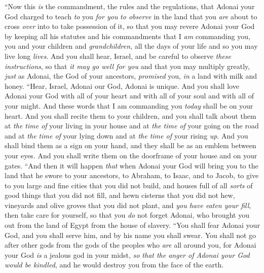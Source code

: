 \begin{biblechapter} %
 “Now this \textit{is} the commandment, the rules and the regulations, that Adonai your God charged to teach \textit{to} you \textit{for you} \textit{to observe} in the land that you \textit{are} about to cross \textit{over} into to take possession of it,
\verse so that you may revere Adonai your God by keeping all his statutes and his commandments that I \textit{am} commanding you, you and your children and \textit{grandchildren}, all the days of your life and so you may live long \textit{lives}.
\verse And you shall hear, Israel, and be careful to observe \textit{these instructions}, so that \textit{it may go well for you} and that you may multiply greatly, \textit{just} as Adonai, the God of your ancestors, \textit{promised} you, \textit{in} a land with milk and honey.
\verse “Hear, Israel, Adonai our God, Adonai is unique.
\verse And you shall love Adonai your God with all of your heart and with all of your soul and with all of your might.
\verse And these words that I am commanding you \textit{today} shall be on your heart.
\verse And you shall recite them to your children, and you shall talk about them at \textit{the time of} your living in your house and at \textit{the time of} your going on the road and at \textit{the time of} your lying down and at \textit{the time of} your rising \textit{up}.
\verse And you shall bind them as a sign on your hand, and they shall be as an emblem between your eyes.
\verse And you shall write them on the doorframe of your house and on your gates.
\verse “And then it will happen \textit{that} when Adonai your God will bring you to the land that he swore to your ancestors, to Abraham, to Isaac, and to Jacob, to give to you large and fine cities that you did not build,
\verse and houses full of all \textit{sorts} of good things that you did not fill, and hewn cisterns that you did not hew, vineyards and olive groves that you did not plant, and \textit{you have eaten your fill},
\verse then take care for yourself, so that you \textit{do} not forget Adonai, who brought you out from the land of Egypt from the house of slavery.
\verse “You shall fear Adonai your God, and you shall serve him, and by his name you shall swear.
\verse You shall not go after other gods from the gods of the peoples who \textit{are} all around you,
\verse for Adonai your God \textit{is} a jealous god in your midst, \textit{so that the anger of Adonai your God would be kindled}, and he would destroy you from the face of the earth.

\end{biblechapter}
